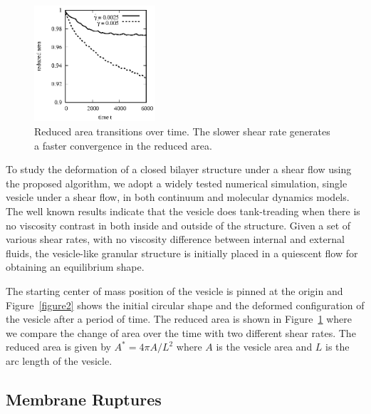 \documentclass[lineno]{jfm}
\begin{document}
\begin{figure}
\begin{center}
\includegraphics[width=0.4\textwidth]{ReducedArea.eps}
\end{center} 
  \caption{Reduced area transitions over time. The slower shear rate generates a faster convergence in the reduced area. 
  }
    \label{figure3}
\end{figure}
%

To study the deformation of a closed bilayer structure under a shear flow using the proposed algorithm, 
we adopt a widely tested numerical simulation, single vesicle under a shear flow, in both continuum and molecular dynamics models. The well known results indicate that the vesicle does tank-treading when there is no viscosity contrast in both inside and outside of the structure.
Given a set of various shear rates, with no viscosity difference between internal and external fluids, 
the vesicle-like granular structure is initially placed in a quiescent flow for obtaining an equilibrium shape.

The starting center of mass position of the vesicle is pinned at the origin and Figure~\ref{figure2} shows 
the initial circular shape  and the deformed configuration of the vesicle after a period of time. 
The reduced area is shown in Figure~\ref{figure3} where we compare the change of area over the time with two different shear rates. The reduced area is given by $A^* = 4\pi A/L^2$
where $A$ is the vesicle area and $L$ is the arc length of the vesicle.











\subsection{Membrane Ruptures}
\end{document}
